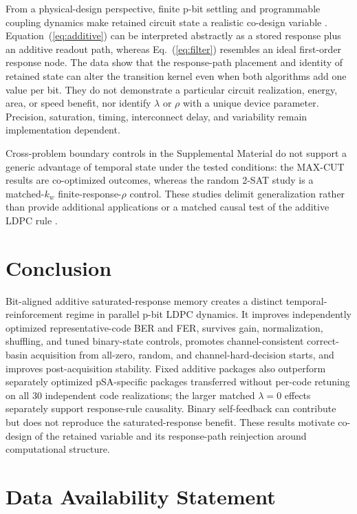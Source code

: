 \documentclass[aps,prapplied,reprint,superscriptaddress,longbibliography,floatfix]{revtex4-2}
\begin{document}
From a physical-design perspective, finite p-bit settling and programmable coupling dynamics make retained circuit state a realistic co-design variable \cite{mcgoldrick2022settling,gibeault2024coupling}.  Equation~(\ref{eq:additive}) can be interpreted abstractly as a stored response plus an additive readout path, whereas Eq.~(\ref{eq:filter}) resembles an ideal first-order response node.  The data show that the response-path placement and identity of retained state can alter the transition kernel even when both algorithms add one value per bit.  They do not demonstrate a particular circuit realization, energy, area, or speed benefit, nor identify $\lambda$ or $\rho$ with a unique device parameter.  Precision, saturation, timing, interconnect delay, and variability remain implementation dependent.

Cross-problem boundary controls in the Supplemental Material do not support a generic advantage of temporal state under the tested conditions: the MAX-CUT results are co-optimized outcomes, whereas the random 2-SAT study is a matched-$k_w$ finite-response-$\rho$ control.  These studies delimit generalization rather than provide additional applications or a matched causal test of the additive LDPC rule \cite{supplement}.

\section{Conclusion}
\label{sec:conclusion}

Bit-aligned additive saturated-response memory creates a distinct temporal-reinforcement regime in parallel p-bit LDPC dynamics.  It improves independently optimized representative-code BER and FER, survives gain, normalization, shuffling, and tuned binary-state controls, promotes channel-consistent correct-basin acquisition from all-zero, random, and channel-hard-decision starts, and improves post-acquisition stability.  Fixed additive packages also outperform separately optimized pSA-specific packages transferred without per-code retuning on all 30 independent code realizations; the larger matched $\lambda=0$ effects separately support response-rule causality.  Binary self-feedback can contribute but does not reproduce the saturated-response benefit.  These results motivate co-design of the retained variable and its response-path reinjection around computational structure.

\section*{Data Availability Statement}
\end{document}
